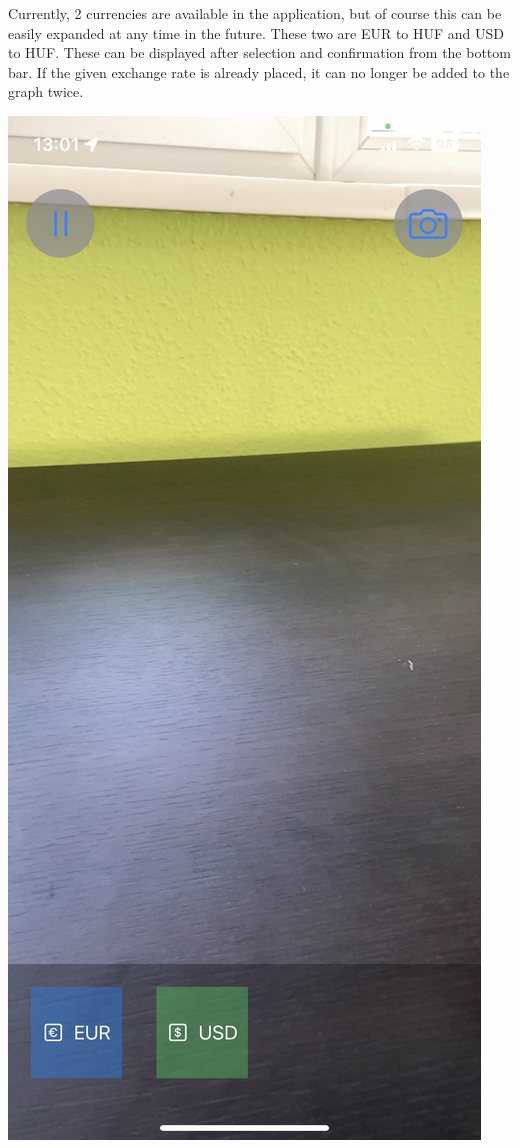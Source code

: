 \documentclass{report}
\begin{document}
Currently, 2 currencies are available in the application, but of course this can be easily expanded at any time in the future. These two are EUR to HUF and USD to HUF. These can be displayed after selection and confirmation from the bottom bar. If the given exchange rate is already placed, it can no longer be added to the graph twice.

\includegraphics[scale=0.2]{selector.jpeg}
\end{document}

